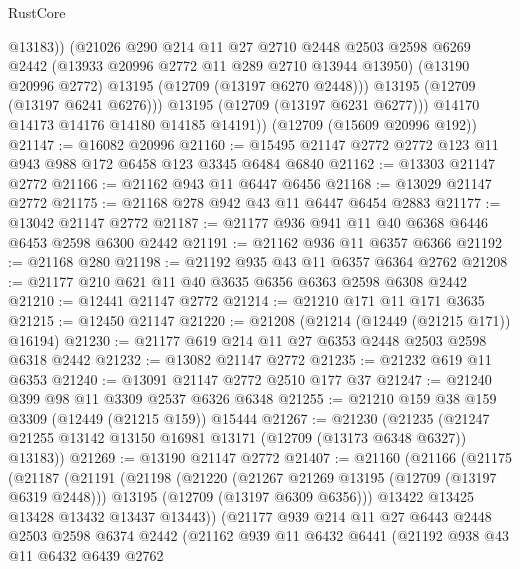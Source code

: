 \begin{lexlean}{RustCore}
\begin{coremodule}
                @13183))
            (@21026
              @290
              @214
              @11
              @27
              @2710
              @2448
              @2503
              @2598
              @6269
              @2442
              (@13933 @20996 @2772 @11 @289 @2710 @13944 @13950)
              (@13190 @20996 @2772)
              @13195
              (@12709 (@13197 @6270 @2448)))
            @13195
            (@12709 (@13197 @6241 @6276)))
          @13195
          (@12709 (@13197 @6231 @6277)))
        @14170
        @14173
        @14176
        @14180
        @14185
        @14191))
    (@12709 (@15609 @20996 @192))
@21147 := @16082 @20996
@21160 := @15495 @21147 @2772 @2772 @123 @11 @943 @988 @172 @6458 @123 @3345 @6484 @6840
@21162 := @13303 @21147 @2772
@21166 := @21162 @943 @11 @6447 @6456
@21168 := @13029 @21147 @2772
@21175 := @21168 @278 @942 @43 @11 @6447 @6454 @2883
@21177 := @13042 @21147 @2772
@21187 := @21177 @936 @941 @11 @40 @6368 @6446 @6453 @2598 @6300 @2442
@21191 := @21162 @936 @11 @6357 @6366
@21192 := @21168 @280
@21198 := @21192 @935 @43 @11 @6357 @6364 @2762
@21208 := @21177 @210 @621 @11 @40 @3635 @6356 @6363 @2598 @6308 @2442
@21210 := @12441 @21147 @2772
@21214 := @21210 @171 @11 @171 @3635
@21215 := @12450 @21147
@21220 := @21208 (@21214 (@12449 (@21215 @171)) @16194)
@21230 := @21177 @619 @214 @11 @27 @6353 @2448 @2503 @2598 @6318 @2442
@21232 := @13082 @21147 @2772
@21235 := @21232 @619 @11 @6353
@21240 := @13091 @21147 @2772 @2510 @177 @37
@21247 := @21240 @399 @98 @11 @3309 @2537 @6326 @6348
@21255 := @21210 @159 @38 @159 @3309 (@12449 (@21215 @159)) @15444
@21267 := @21230
    (@21235 (@21247 @21255 @13142 @13150 @16981 @13171 (@12709 (@13173 @6348 @6327)) @13183))
@21269 := @13190 @21147 @2772
@21407 := @21160
    (@21166
      (@21175
        (@21187
          (@21191
            (@21198
              (@21220
                (@21267 @21269 @13195 (@12709 (@13197 @6319 @2448)))
                @13195
                (@12709 (@13197 @6309 @6356)))
              @13422
              @13425
              @13428
              @13432
              @13437
              @13443))
          (@21177
            @939
            @214
            @11
            @27
            @6443
            @2448
            @2503
            @2598
            @6374
            @2442
            (@21162
              @939
              @11
              @6432
              @6441
              (@21192
                @938
                @43
                @11
                @6432
                @6439
                @2762

\end{coremodule}
\end{lexlean}
